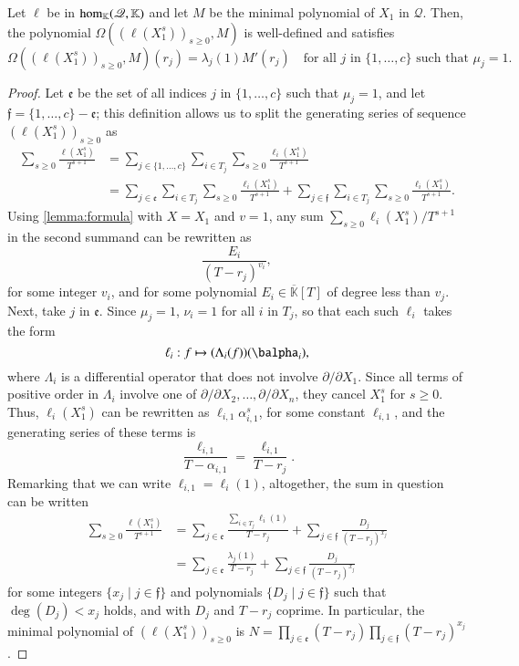\documentclass[final,1p,times,authoryear]{elsarticle}
\newcommand{\lf}{X}
\newcommand{\residueI}{\mathscr{Q}}
\def\K{\mathbb{K}}
\def\K {\ensuremath{\mathbb{K}}}
\def\Kbar {{\ensuremath{\overline{\mathbb{K}}}}}
\begin{document}
\begin{lemma}\label{lemma:valuelambda}
  Let $\ell$ be in ${\rm hom}_\K(\residueI,\K)$ and let $M$ be the minimal
  polynomial of $X_1$ in $\residueI$. Then, the polynomial
  $\Omega((\ell(X_1^s))_{s\ge0},M)$ is well-defined and satisfies
  $$\Omega((\ell(X_1^s))_{s\ge0},M)(r_j) = \lambda_j(1) M'(r_j) \quad \text{for all $j$ in $\{1,\dots,c\}$ such that $\mu_j=1$.}$$
\end{lemma}
\begin{proof}
  Let $\mathfrak{e}$ be the set of all indices $j$ in $\{1,\dots,c\}$
  such that $\mu_j=1$, and let $\mathfrak{f}=\{1,\dots,c\}-\mathfrak{e}$;
  this definition allows us to split the generating series
  of sequence $(\ell(X_1^s))_{s\ge 0}$ as
  \begin{align*}
    \sum_{s \ge 0} \frac{\ell(X_1^s)}{T^{s+1}  }
  &= \sum_{j \in \{1,\dots,c\}}\sum_{i\in T_j} 
  \sum_{s \ge 0} \frac{\ell_i(X_1^s)}{T^{s+1}}  \\
  &=\sum_{j \in \mathfrak{e}}\sum_{i\in T_j}\sum_{s \ge 0}  \frac{\ell_i(X_1^s)}{T^{s+1}} +
  \sum_{j \in \mathfrak{f}}\sum_{i\in T_j}\sum_{s \ge 0}  \frac{\ell_i(X_1^s)}{T^{s+1}}.
  \end{align*}
  Using \cref{lemma:formula} with $\lf=X_1$ and $v=1$, any sum $\sum_{s \ge 0} \ell_i(X_1^s)/T^{s+1}$ 
  in the second summand
  can be rewritten as 
  $$\frac{E_i}{(T-r_j)^{v_i}},$$
  for some integer $v_i$, and for some polynomial $E_i \in \Kbar[T]$ of degree less than
  $v_j$. Next, take $j$ in $\mathfrak{e}$. Since $\mu_j=1$, $\nu_i=1$ for all $i$ in $T_j$,
  so that
  each such $\ell_i$ takes the form 
  $$\ell_i: f \mapsto (\Lambda_{i}(f))(\balpha_i),$$ where $\Lambda_{i}$
  is a differential operator that does not involve $\partial/\partial
  X_1$. Since all terms of positive order in $\Lambda_i$ involve one of
  $\partial/\partial X_2,\dots,\partial/\partial X_n$, they cancel
  $X_1^s$ for $s\ge 0$. Thus, $\ell_i(X_1^s)$ can be rewritten 
  as $\ell_{i,1} \alpha_{i,1}^s$, for some constant $\ell_{i,1}$,
  and the generating series of these terms is 
  $$\frac {\ell_{i,1}}{T-\alpha_{i,1}}=\frac {\ell_{i,1}}{T-r_j}.$$
  Remarking  that we can write $\ell_{i,1}=\ell_i(1)$,
  altogether, the sum in question can be written
  \begin{align*}
    \sum_{s \ge 0} \frac{\ell(X_1^s)}{T^{s+1}  }
  &=\sum_{j \in \mathfrak{e}} 
  \frac{ \sum_{i\in T_j}  \ell_{i}(1) }{T-r_j }
  + \sum_{j \in \mathfrak{f}} \frac{D_j}{(T-r_j )^{x_j}}\\
  &= \sum_{j \in \mathfrak{e}} 
  \frac{ \lambda_j(1) }{T-r_j }
  + \sum_{j \in \mathfrak{f}} \frac{D_j}{(T-r_j )^{x_j}}
  \end{align*}
  for some integers $\{x_j \mid j \in \mathfrak{f}\}$ and
  polynomials $\{D_j \mid j \in \mathfrak{f}\}$ such that
  $\deg(D_j) < x_j$ holds, and with $D_j$ and $T-r_j $
  coprime. In particular, the minimal polynomial of  $(\ell(X_1^s))_{s\ge 0}$ is $N=\prod_{j\in
  \mathfrak{e}}(T-r_j) \prod_{j \in  \mathfrak{f}}(T-r_j)^{x_j}$.


\end{proof}
\end{document}
